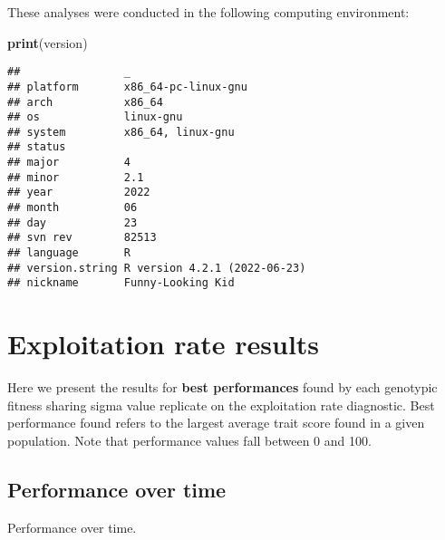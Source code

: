 \documentclass[]{book}
\newenvironment{Shaded}{\begin{snugshade}}{\end{snugshade}}
\newcommand{\DataTypeTok}[1]{\textcolor[rgb]{0.13,0.29,0.53}{#1}}
\newcommand{\KeywordTok}[1]{\textcolor[rgb]{0.13,0.29,0.53}{\textbf{#1}}}
\newcommand{\NormalTok}[1]{#1}
\newcommand{\OperatorTok}[1]{\textcolor[rgb]{0.81,0.36,0.00}{\textbf{#1}}}
\newcommand{\StringTok}[1]{\textcolor[rgb]{0.31,0.60,0.02}{#1}}
\begin{document}
These analyses were conducted in the following computing environment:

\begin{Shaded}
\begin{Highlighting}[]
\KeywordTok{print}\NormalTok{(version)}
\end{Highlighting}
\end{Shaded}

\begin{verbatim}
##                _                           
## platform       x86_64-pc-linux-gnu         
## arch           x86_64                      
## os             linux-gnu                   
## system         x86_64, linux-gnu           
## status                                     
## major          4                           
## minor          2.1                         
## year           2022                        
## month          06                          
## day            23                          
## svn rev        82513                       
## language       R                           
## version.string R version 4.2.1 (2022-06-23)
## nickname       Funny-Looking Kid
\end{verbatim}

\hypertarget{exploitation-rate-results-5}{%
\section{Exploitation rate results}\label{exploitation-rate-results-5}}

Here we present the results for \textbf{best performances} found by each genotypic fitness sharing sigma value replicate on the exploitation rate diagnostic.
Best performance found refers to the largest average trait score found in a given population.
Note that performance values fall between 0 and 100.

\hypertarget{performance-over-time-14}{%
\subsection{Performance over time}\label{performance-over-time-14}}

Performance over time.

\begin{Shaded}
\end{Shaded}
\end{document}
